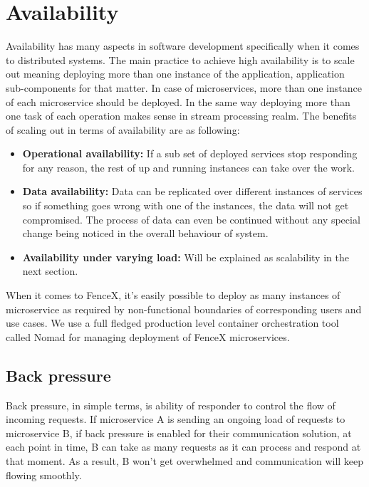 \documentclass[a4]{report}
\begin{document}
    \section{Availability}
    Availability has many aspects in software development specifically when it comes to distributed systems.
    The main practice to achieve high availability is to scale out meaning deploying more than one instance of the
    application, application sub-components for that matter.
    In case of microservices, more than one instance of each microservice should be deployed.
    In the same way deploying more than one task of each operation makes sense in stream processing realm.
    The benefits of scaling out in terms of availability are as following:
    \begin{itemize}
        \item \textbf{Operational availability:} If a sub set of deployed services stop responding for any
        reason, the rest of up and running instances can take over the work.
        \item \textbf{Data availability:} Data can be replicated over different instances of services so if
        something goes wrong with one of the instances, the data will not get compromised.
        The process of data can even be continued without any special change being noticed in the overall behaviour of
        system.
        \item \textbf{Availability under varying load:} Will be explained as scalability in the next section.
    \end{itemize}

    When it comes to FenceX, it's easily possible to deploy as many instances of microservice as required by
    non-functional boundaries of corresponding users and use cases.
    We use a full fledged production level container orchestration tool called Nomad\cite{nomad} for managing deployment of
    FenceX microservices.

    \subsection{Back pressure}
    Back pressure\cite{reactive-manifesto}, in simple terms, is ability of responder to control the flow of incoming requests.
    If microservice A is sending an ongoing load of requests to microservice B, if back pressure is enabled for
    their communication solution, at each point in time, B can take as many requests as it can process and respond at
    that moment.
    As a result, B won't get overwhelmed and communication will keep flowing smoothly.
\end{document}

